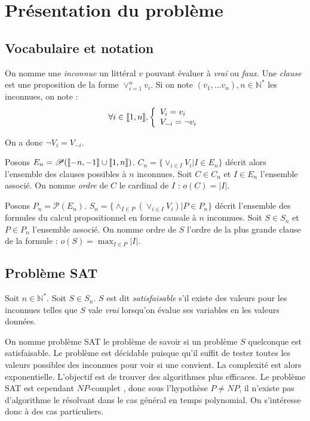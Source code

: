 \section{Présentation du problème}
\subsection{Vocabulaire et notation}
On nomme une \emph{inconnue} un littéral $v$ pouvant évaluer à \emph{vrai} ou
\emph{faux}. Une \emph{clause} est une proposition de la forme $\vee_{i=1}^n v_i$.
Si on note $(v_1,\ldots v_n), n\in\mathbb{N}^*$ les inconnues, on note :
    \[ \forall i\in\llbracket 1, n \rrbracket, \left\{\begin{array}{l}
            V_i = v_i \\
            V_{-i} = \neg v_i
       \end{array}\right.
     \]

On a donc $\neg V_i = V_{-i}$.

Posons $E_n = \mathscr{P}(\llbracket -n, -1 \rrbracket\cup\llbracket 1, n \rrbracket)$. $C_n = \{\vee_{i\in I} V_i | I\in E_n\}$
décrit alors l'ensemble des clauses possibles à $n$ inconnues. Soit $C\in C_n$
et $I\in E_n$ l'ensemble associé. On nomme \emph{ordre} de $C$ le cardinal de
$I$ : $o(C) = |I|$.

Posons $P_n = \mathscr{P}(E_n)$. $S_n = \{\wedge_{I\in P} (\vee_{i\in I} V_i) | P\in P_n\}$
décrit l'ensemble des formules du calcul propositionnel en forme causale à $n$
inconnues. Soit $S\in S_n$ et $P\in P_n$ l'ensemble associé. On nomme ordre de
$S$ l'ordre de la plus grande clause de la formule : $o(S) = \max_{I\in P} |I|$.

\subsection{Problème SAT}
Soit $n\in\mathbb{N}^*$. Soit $S\in S_n$. $S$ est dit \emph{satisfaisable} s'il
existe des valeurs pour les inconnues telles que $S$ vale \emph{vrai} lorsqu'on
évalue ses variables en les valeurs données.

On nomme problème SAT le problème de savoir si un problème $S$ quelconque est
satisfaisable. Le problème est décidable puisque qu'il suffit de tester toutes
les valeurs possibles des inconnues pour voir si une convient. La complexité
est alors exponentielle. L'objectif est de trouver des algorithmes plus
efficaces. Le problème SAT est cependant $NP$-complet \cite{cook71}, donc
sous l'hypothèse $P\neq NP$, il n'existe pas d'algorithme le résolvant dans le
cas général en temps polynomial. On s'intéresse donc à des cas particuliers.


